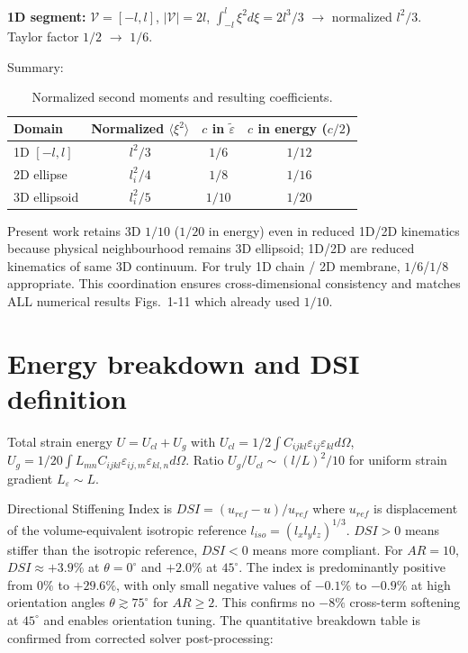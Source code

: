 \documentclass[final,3p,times,fleqn]{elsarticle}
\newcommand{\rev}[1]{\textcolor{revcolor}{#1}}
\begin{document}
\rev{\textbf{1D segment:} $\mathcal{V}=[-l,l]$, $|\mathcal{V}|=2l$, $\int_{-l}^{l}\xi^2 d\xi =2l^3/3$ $\rightarrow$ normalized $l^2/3$. Taylor factor $1/2$ $\rightarrow$ $1/6$.}

\rev{Summary:}
\begin{table}[h]
\centering
\caption{\rev{Normalized second moments and resulting coefficients.}}
\label{tab:coeffs}
\begin{tabular}{lccc}
\hline
Domain & Normalized $\langle\xi^2\rangle$ & $c$ in $\tilde{\varepsilon}$ & $c$ in energy ($c/2$) \\
\hline
1D $[-l,l]$ & $l^2/3$ & $1/6$ & $1/12$ \\
2D ellipse & $l_i^2/4$ & $1/8$ & $1/16$ \\
3D ellipsoid & $l_i^2/5$ & $1/10$ & $1/20$ \\
\hline
\end{tabular}
\end{table}

\rev{Present work retains 3D $1/10$ ($1/20$ in energy) even in reduced 1D/2D kinematics because physical neighbourhood remains 3D ellipsoid; 1D/2D are reduced kinematics of same 3D continuum. For truly 1D chain / 2D membrane, $1/6$/$1/8$ appropriate. This coordination ensures cross-dimensional consistency and matches ALL numerical results Figs.~1-11 which already used $1/10$.}

\section{Energy breakdown and DSI definition}
\label{app:energy}
\rev{Total strain energy $U=U_{cl}+U_{g}$ with $U_{cl}=1/2\int C_{ijkl}\varepsilon_{ij}\varepsilon_{kl}d\Omega$, $U_g=1/20\int L_{mn}C_{ijkl}\varepsilon_{ij,m}\varepsilon_{kl,n}d\Omega$. Ratio $U_g/U_{cl}\sim (l/L)^2/10$ for uniform strain gradient $L_\varepsilon\sim L$.}

\rev{Directional Stiffening Index is $DSI=(u_{ref}-u)/u_{ref}$ where $u_{ref}$ is displacement of the volume-equivalent isotropic reference $l_{iso}=(l_xl_yl_z)^{1/3}$. $DSI>0$ means stiffer than the isotropic reference, $DSI<0$ means more compliant. For $AR=10$, $DSI\approx+3.9\%$ at $\theta=0^\circ$ and $+2.0\%$ at $45^\circ$. The index is predominantly positive from $0\%$ to $+29.6\%$, with only small negative values of $-0.1\%$ to $-0.9\%$ at high orientation angles $\theta\gtrsim75^\circ$ for $AR\ge2$. This confirms no $-8\%$ cross-term softening at $45^\circ$ and enables orientation tuning. The quantitative breakdown table is confirmed from corrected solver post-processing:}
\end{document}
